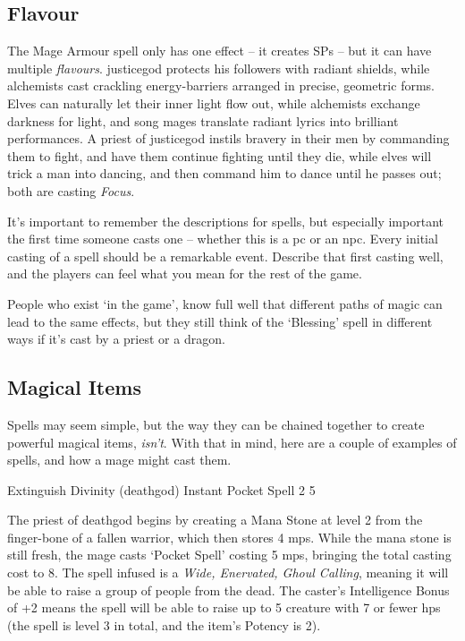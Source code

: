 \begin{multicols}{2}

\subsection{Flavour}

The Mage Armour spell only has one effect -- it creates \glspl{SP} -- but it can have multiple \textit{flavours}.
\Gls{justicegod} protects his followers with radiant shields, while alchemists cast crackling energy-barriers arranged in precise, geometric forms.
Elves can naturally let their inner light flow out, while alchemists exchange darkness for light, and song mages translate radiant lyrics into brilliant performances.
A priest of \gls{justicegod} instils bravery in their men by commanding them to fight, and have them continue fighting until they die, while elves will trick a man into dancing, and then command him to dance until he passes out; both are casting \textit{Focus}.

It's important to remember the descriptions for spells, but especially important the first time someone casts one -- whether this is a \gls{pc} or an \gls{npc}.
Every initial casting of a spell should be a remarkable event.
Describe that first casting well, and the players can feel what you mean for the rest of the game.

People who exist `in the game', know full well that different paths of magic can lead to the same effects, but they still think of the `Blessing' spell in different ways if it's cast by a priest or a dragon.

\subsection{Magical Items}

\noindent
Spells may seem simple, but the way they can be chained together to create powerful magical items, \emph{isn't}.
With that in mind, here are a couple of examples of spells, and how a mage might cast them.

	{Extinguish}%
	{Divinity (\gls{deathgod})}%
	{Instant}%
	{Pocket Spell}%
	{2}%
	{5}%

The priest of \gls{deathgod} begins by creating a Mana Stone at level 2 from the finger-bone of a fallen warrior, which then stores 4 \glspl{mp}.
While the mana stone is still fresh, the mage casts `Pocket Spell' costing 5 \glspl{mp}, bringing the total casting cost to 8.
The spell infused is a \textit{Wide, Enervated, Ghoul Calling}, meaning it will be able to raise a group of people from the dead.
The caster's Intelligence Bonus of +2 means the spell will be able to raise up to 5 creature with 7 or fewer \glspl{hp} (the spell is level 3 in total, and the item's Potency is 2).


\end{multicols}
